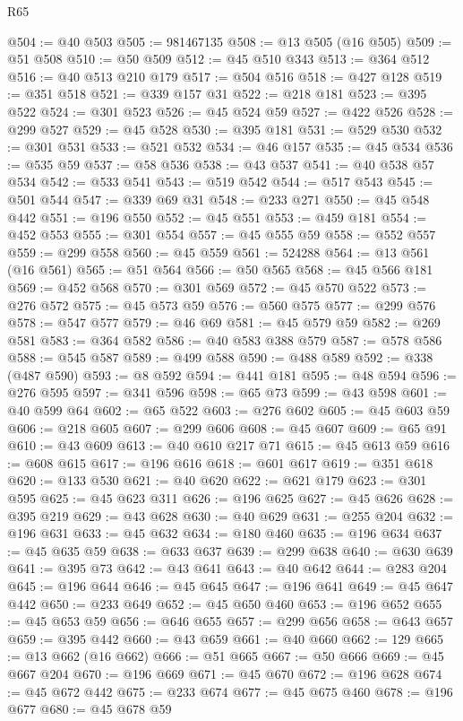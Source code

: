 \begin{lexlean}{R65}
\begin{coremodule}
@504 := @40 @503
@505 := 981467135
@508 := @13 @505 (@16 @505)
@509 := @51 @508
@510 := @50 @509
@512 := @45 @510 @343
@513 := @364 @512
@516 := @40 @513 @210 @179
@517 := @504 @516
@518 := @427 @128
@519 := @351 @518
@521 := @339 @157 @31
@522 := @218 @181
@523 := @395 @522
@524 := @301 @523
@526 := @45 @524 @59
@527 := @422 @526
@528 := @299 @527
@529 := @45 @528
@530 := @395 @181
@531 := @529 @530
@532 := @301 @531
@533 := @521 @532
@534 := @46 @157
@535 := @45 @534
@536 := @535 @59
@537 := @58 @536
@538 := @43 @537
@541 := @40 @538 @57 @534
@542 := @533 @541
@543 := @519 @542
@544 := @517 @543
@545 := @501 @544
@547 := @339 @69 @31
@548 := @233 @271
@550 := @45 @548 @442
@551 := @196 @550
@552 := @45 @551
@553 := @459 @181
@554 := @452 @553
@555 := @301 @554
@557 := @45 @555 @59
@558 := @552 @557
@559 := @299 @558
@560 := @45 @559
@561 := 524288
@564 := @13 @561 (@16 @561)
@565 := @51 @564
@566 := @50 @565
@568 := @45 @566 @181
@569 := @452 @568
@570 := @301 @569
@572 := @45 @570 @522
@573 := @276 @572
@575 := @45 @573 @59
@576 := @560 @575
@577 := @299 @576
@578 := @547 @577
@579 := @46 @69
@581 := @45 @579 @59
@582 := @269 @581
@583 := @364 @582
@586 := @40 @583 @388 @579
@587 := @578 @586
@588 := @545 @587
@589 := @499 @588
@590 := @488 @589
@592 := @338 (@487 @590)
@593 := @8 @592
@594 := @441 @181
@595 := @48 @594
@596 := @276 @595
@597 := @341 @596
@598 := @65 @73
@599 := @43 @598
@601 := @40 @599 @64
@602 := @65 @522
@603 := @276 @602
@605 := @45 @603 @59
@606 := @218 @605
@607 := @299 @606
@608 := @45 @607
@609 := @65 @91
@610 := @43 @609
@613 := @40 @610 @217 @71
@615 := @45 @613 @59
@616 := @608 @615
@617 := @196 @616
@618 := @601 @617
@619 := @351 @618
@620 := @133 @530
@621 := @40 @620
@622 := @621 @179
@623 := @301 @595
@625 := @45 @623 @311
@626 := @196 @625
@627 := @45 @626
@628 := @395 @219
@629 := @43 @628
@630 := @40 @629
@631 := @255 @204
@632 := @196 @631
@633 := @45 @632
@634 := @180 @460
@635 := @196 @634
@637 := @45 @635 @59
@638 := @633 @637
@639 := @299 @638
@640 := @630 @639
@641 := @395 @73
@642 := @43 @641
@643 := @40 @642
@644 := @283 @204
@645 := @196 @644
@646 := @45 @645
@647 := @196 @641
@649 := @45 @647 @442
@650 := @233 @649
@652 := @45 @650 @460
@653 := @196 @652
@655 := @45 @653 @59
@656 := @646 @655
@657 := @299 @656
@658 := @643 @657
@659 := @395 @442
@660 := @43 @659
@661 := @40 @660
@662 := 129
@665 := @13 @662 (@16 @662)
@666 := @51 @665
@667 := @50 @666
@669 := @45 @667 @204
@670 := @196 @669
@671 := @45 @670
@672 := @196 @628
@674 := @45 @672 @442
@675 := @233 @674
@677 := @45 @675 @460
@678 := @196 @677
@680 := @45 @678 @59

\end{coremodule}
\end{lexlean}

